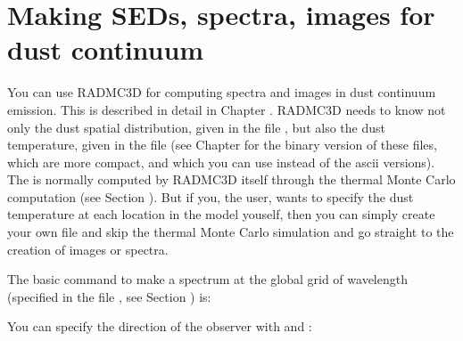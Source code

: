 \documentclass[letterpaper,10pt,english]{sphinxmanual}
\begin{document}
\section{Making SEDs, spectra, images for dust continuum}
\label{\detokenize{dustradtrans:making-seds-spectra-images-for-dust-continuum}}\label{\detokenize{dustradtrans:sec-dust-ray-tracing}}
You can use RADMC\sphinxhyphen{}3D for computing spectra and images in dust continuum
emission. This is described in detail in Chapter
{\hyperref[\detokenize{imagesspectra:chap-images-spectra}]{}}. RADMC\sphinxhyphen{}3D needs to know not only the dust spatial
distribution, given in the file , but also the
dust temperature, given in the file  (see
Chapter {\hyperref[\detokenize{binaryio:chap-binary-io}]{}} for the binary version of these files, which
are more compact, and which you can use instead of the ascii versions). The
 is normally computed by RADMC\sphinxhyphen{}3D itself
through the thermal Monte Carlo computation (see Section
{\hyperref[\detokenize{dustradtrans:sec-dust-thermal-monte-carlo}]{}}). But if you, the user, wants to specify
the dust temperature at each location in the model youself, then you can
simply create your own file  and skip the
thermal Monte Carlo simulation and go straight to the creation of images or
spectra.

The basic command to make a spectrum at the global grid of wavelength
(specified in the file ,
see Section {\hyperref[\detokenize{inputoutputfiles:sec-wavelengths}]{}}) is:

\begin{sphinxVerbatim}[commandchars=\\\{\}]
 
\end{sphinxVerbatim}

You can specify the direction of the observer with  and :

\begin{sphinxVerbatim}[commandchars=\\\{\}]
     
\end{sphinxVerbatim}
\end{document}
